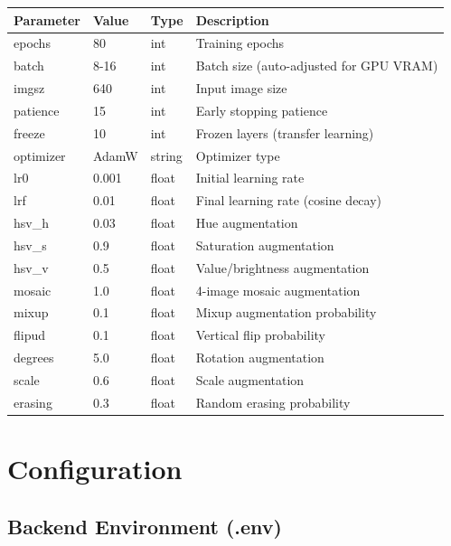 \documentclass[12pt,a4paper,oneside]{book}
\begin{document}
\begin{longtable}{|l|l|l|p{6cm}|}
    \hline
    \textbf{Parameter} & \textbf{Value} & \textbf{Type} & \textbf{Description} \\
    \hline
    epochs & 80 & int & Training epochs \\
    \hline
    batch & 8-16 & int & Batch size (auto-adjusted for GPU VRAM) \\
    \hline
    imgsz & 640 & int & Input image size \\
    \hline
    patience & 15 & int & Early stopping patience \\
    \hline
    freeze & 10 & int & Frozen layers (transfer learning) \\
    \hline
    optimizer & AdamW & string & Optimizer type \\
    \hline
    lr0 & 0.001 & float & Initial learning rate \\
    \hline
    lrf & 0.01 & float & Final learning rate (cosine decay) \\
    \hline
    hsv\_h & 0.03 & float & Hue augmentation \\
    \hline
    hsv\_s & 0.9 & float & Saturation augmentation \\
    \hline
    hsv\_v & 0.5 & float & Value/brightness augmentation \\
    \hline
    mosaic & 1.0 & float & 4-image mosaic augmentation \\
    \hline
    mixup & 0.1 & float & Mixup augmentation probability \\
    \hline
    flipud & 0.1 & float & Vertical flip probability \\
    \hline
    degrees & 5.0 & float & Rotation augmentation \\
    \hline
    scale & 0.6 & float & Scale augmentation \\
    \hline
    erasing & 0.3 & float & Random erasing probability \\
    \hline
\end{longtable}

\chapter{Configuration}

\section{Backend Environment (.env)}
\end{document}
